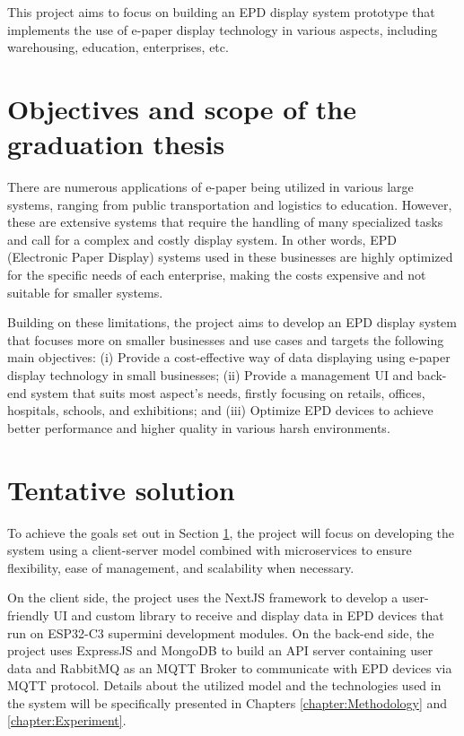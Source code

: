 \documentclass[../Main.tex]{subfiles}
\begin{document}
This project aims to focus on building an EPD display system prototype that implements the use of e-paper display technology in various aspects, including warehousing, education, enterprises, etc.

\section{Objectives and scope of the graduation thesis}
\label{section:1.2}
There are numerous applications of e-paper being utilized in various large systems, ranging from public transportation and logistics to education. However, these are extensive systems that require the handling of many specialized tasks and call for a complex and costly display system. In other words, EPD (Electronic Paper Display) systems used in these businesses are highly optimized for the specific needs of each enterprise, making the costs expensive and not suitable for smaller systems.

Building on these limitations, the project aims to develop an EPD display system that focuses more on smaller businesses and use cases and targets the following main objectives: (i) Provide a cost-effective way of data displaying using e-paper display technology in small businesses; (ii) Provide a management UI and back-end system that suits most aspect's needs, firstly focusing on retails, offices, hospitals, schools, and exhibitions; and (iii) Optimize EPD devices to achieve better performance and higher quality in various harsh environments.

\section{Tentative solution}
\label{section:1.3}
To achieve the goals set out in Section \ref{section:1.2}, the project will focus on developing the system using a client-server model combined with microservices to ensure flexibility, ease of management, and scalability when necessary. 

On the client side, the project uses the NextJS framework to develop a user-friendly UI and custom library to receive and display data in EPD devices that run on ESP32-C3 supermini development modules. On the back-end side, the project uses ExpressJS and MongoDB to build an API server containing user data and RabbitMQ as an MQTT Broker to communicate with EPD devices via MQTT protocol. Details about the utilized model and the technologies used in the system will be specifically presented in Chapters \ref{chapter:Methodology} and \ref{chapter:Experiment}.
\end{document}
